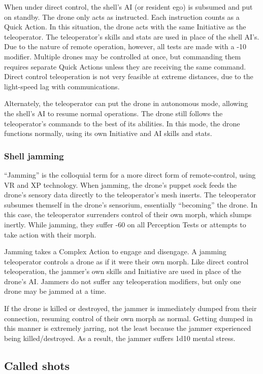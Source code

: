 When under direct control, the shell’s AI (or resident ego) is subsumed and put on standby. The drone only acts as instructed. Each instruction counts as a Quick Action. In this situation, the drone acts with the same Initiative as the teleoperator. The teleoperator’s skills and stats are used in place of the shell AI’s. Due to the nature of remote operation, however, all tests are made with a -10 modifier. Multiple drones may be controlled at once, but commanding them requires separate Quick Actions unless they are receiving the same command. Direct control teleoperation is not very feasible at extreme distances, due to the light-speed lag with communications.

Alternately, the teleoperator can put the drone in autonomous mode, allowing the shell’s AI to resume normal operations. The drone still follows the teleoperator’s commands to the best of its abilities. In this mode, the drone functions normally, using its own Initiative and AI skills and stats.

\subsubsection{Shell jamming}

``Jamming'' is the colloquial term for a more direct form of remote-control, using VR and XP technology. When jamming, the drone’s puppet sock feeds the drone’s sensory data directly to the teleoperator’s mesh inserts. The teleoperator subsumes themself in the drone’s sensorium, essentially ``becoming'' the drone. In this case, the teleoperator surrenders control of their own morph, which slumps inertly. While jamming, they suffer -60 on all Perception Tests or attempts to take action with their morph.

Jamming takes a Complex Action to engage and disengage. A jamming teleoperator controls a drone as if it were their own morph. Like direct control teleoperation, the jammer’s own skills and Initiative are used in place of the drone’s AI. Jammers do not suffer any teleoperation modifiers, but only one drone may be jammed at a time.

If the drone is killed or destroyed, the jammer is immediately dumped from their connection, resuming control of their own morph as normal. Getting dumped in this manner is extremely jarring, not the least because the jammer experienced being killed/destroyed. As a result, the jammer suffers 1d10 mental stress.


\subsection{Called shots}
\label{sec:called-shots}

